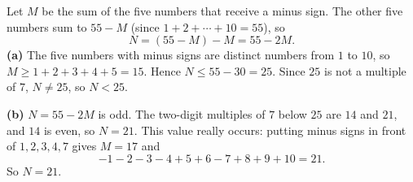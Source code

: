 Let $M$ be the sum of the five numbers that receive a minus sign. The other five numbers sum to $55-M$ (since $1+2+\cdots+10=55$), so
\[
N=(55-M)-M=55-2M .
\]
\textbf{(a)} The five numbers with minus signs are distinct numbers from $1$ to $10$, so $M\ge1+2+3+4+5=15$. Hence $N\le55-30=25$. Since $25$ is not a multiple of $7$, $N\ne25$, so $N<25$.

\textbf{(b)} $N=55-2M$ is odd. The two-digit multiples of $7$ below $25$ are $14$ and $21$, and $14$ is even, so $N=21$. This value really occurs: putting minus signs in front of $1,2,3,4,7$ gives $M=17$ and
\[
-1-2-3-4+5+6-7+8+9+10=21 .
\]
So $\boxed{N=21}$.
